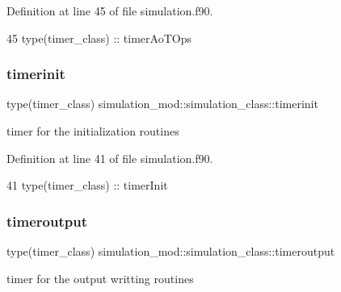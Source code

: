 Definition at line 45 of file simulation.\+f90.


\begin{DoxyCode}
45         \textcolor{keywordtype}{type}(timer\_class) :: timerAoTOps
\end{DoxyCode}
\mbox{\label{structsimulation__mod_1_1simulation__class_ae5fe25a2db3a3e3c6896c13af90edb1c}} 
\subsubsection{\texorpdfstring{timerinit}{timerinit}}
{\footnotesize\ttfamily type(timer\+\_\+class) simulation\+\_\+mod\+::simulation\+\_\+class\+::timerinit\hspace{0.3cm}{\ttfamily [private]}}



timer for the initialization routines 



Definition at line 41 of file simulation.\+f90.


\begin{DoxyCode}
41         \textcolor{keywordtype}{type}(timer\_class) :: timerInit
\end{DoxyCode}
\mbox{\label{structsimulation__mod_1_1simulation__class_a8273da2899310646a161fedc96434bf9}} 
\subsubsection{\texorpdfstring{timeroutput}{timeroutput}}
{\footnotesize\ttfamily type(timer\+\_\+class) simulation\+\_\+mod\+::simulation\+\_\+class\+::timeroutput\hspace{0.3cm}{\ttfamily [private]}}



timer for the output writting routines 



